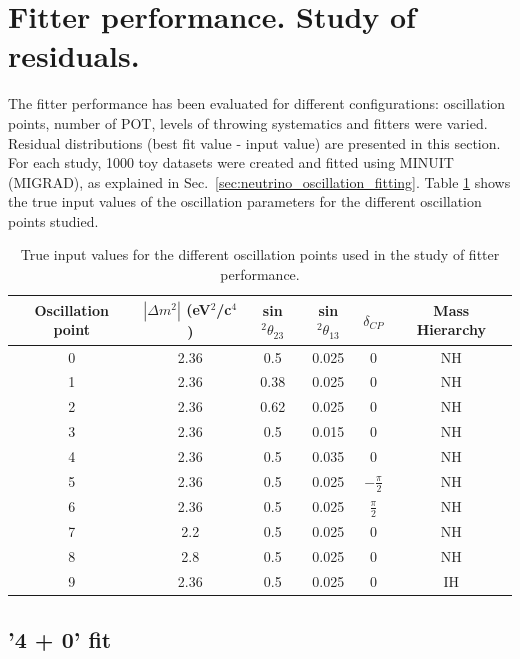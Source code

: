 \clearpage

\section{Fitter performance. Study of residuals.}
\label{app:fitter_performance}

The fitter performance has been evaluated for different configurations: oscillation points, number of POT, levels 
of throwing systematics and fitters were varied. Residual distributions (best fit value - input value)  are 
presented in this section. For each study, 1000 toy datasets were created and fitted using MINUIT 
(MIGRAD), as explained in Sec.\ \ref{sec:neutrino_oscillation_fitting}. Table \ref{tab:osc_points} shows the true input values of the 
oscillation parameters for the different oscillation points studied. 

\begin{table}[htb]
\centering
\begin{tabular}{| c | c  c  c  c  c |}
\hline
Oscillation point &   $|\Delta m^2|$ (eV$^{2}$/c$^{4}$) & sin$^2\theta_{23}$ & sin$^2\theta_{13}$  & $\delta_{CP}$ & Mass Hierarchy \\
\hline
0  & 2.36 & 0.5 & 0.025 & 0 & NH\\
\hline
1  & 2.36 & 0.38 & 0.025 & 0 & NH\\
\hline
2  & 2.36 & 0.62 & 0.025 & 0 & NH\\
\hline
3  & 2.36 & 0.5 & 0.015 & 0 & NH\\
\hline
4  & 2.36 & 0.5 & 0.035 & 0 & NH\\
\hline
5  & 2.36 & 0.5 & 0.025 & $-\frac{\pi}{2}$ & NH\\
\hline
6  & 2.36 & 0.5 & 0.025 & $\frac{\pi}{2}$ & NH \\
\hline
7  & 2.2 & 0.5 & 0.025 & 0 & NH \\
\hline
8  & 2.8 & 0.5 & 0.025 & 0 & NH \\
\hline
9  & 2.36 & 0.5 & 0.025 & 0 & IH\\
\hline
\end{tabular}
\caption{
  True input values for the different oscillation points used in the study of fitter performance.
}
\label{tab:osc_points}
\end{table}


\subsection{'4 + 0' fit}

